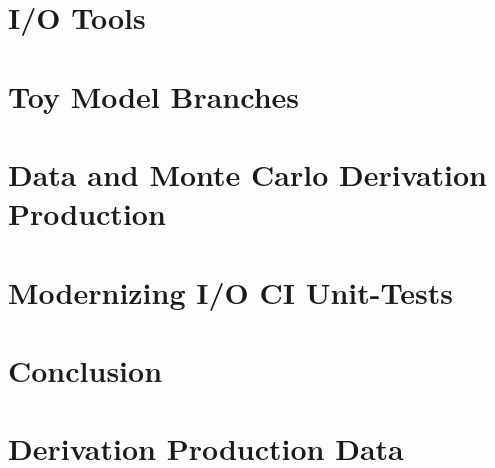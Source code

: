 \documentclass[12pt]{niuthesis}
\begin{document}
\chapter{I/O Tools}


\chapter{Toy Model Branches}


\chapter{Data and Monte Carlo Derivation Production}
\label{chap:DAODProd}


\chapter{Modernizing I/O CI Unit-Tests}


\chapter{Conclusion}




\printbibliography

\clearpage
\appendix

% 

\chapter{Derivation Production Data}

\end{document}
